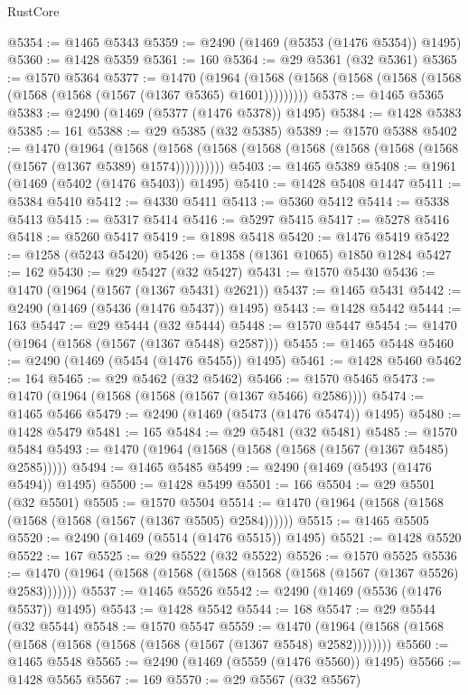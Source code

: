 \begin{lexlean}{RustCore}
\begin{coremodule}
@5354 := @1465 @5343
@5359 := @2490 (@1469 (@5353 (@1476 @5354)) @1495)
@5360 := @1428 @5359
@5361 := 160
@5364 := @29 @5361 (@32 @5361)
@5365 := @1570 @5364
@5377 := @1470
    (@1964 (@1568 (@1568 (@1568 (@1568 (@1568 (@1568 (@1568 (@1567 (@1367 @5365) @1601)))))))))
@5378 := @1465 @5365
@5383 := @2490 (@1469 (@5377 (@1476 @5378)) @1495)
@5384 := @1428 @5383
@5385 := 161
@5388 := @29 @5385 (@32 @5385)
@5389 := @1570 @5388
@5402 := @1470
    (@1964
      (@1568 (@1568 (@1568 (@1568 (@1568 (@1568 (@1568 (@1568 (@1567 (@1367 @5389) @1574))))))))))
@5403 := @1465 @5389
@5408 := @1961 (@1469 (@5402 (@1476 @5403)) @1495)
@5410 := @1428 @5408 @1447
@5411 := @5384 @5410
@5412 := @4330 @5411
@5413 := @5360 @5412
@5414 := @5338 @5413
@5415 := @5317 @5414
@5416 := @5297 @5415
@5417 := @5278 @5416
@5418 := @5260 @5417
@5419 := @1898 @5418
@5420 := @1476 @5419
@5422 := @1258 (@5243 @5420)
@5426 := @1358 (@1361 @1065) @1850 @1284
@5427 := 162
@5430 := @29 @5427 (@32 @5427)
@5431 := @1570 @5430
@5436 := @1470 (@1964 (@1567 (@1367 @5431) @2621))
@5437 := @1465 @5431
@5442 := @2490 (@1469 (@5436 (@1476 @5437)) @1495)
@5443 := @1428 @5442
@5444 := 163
@5447 := @29 @5444 (@32 @5444)
@5448 := @1570 @5447
@5454 := @1470 (@1964 (@1568 (@1567 (@1367 @5448) @2587)))
@5455 := @1465 @5448
@5460 := @2490 (@1469 (@5454 (@1476 @5455)) @1495)
@5461 := @1428 @5460
@5462 := 164
@5465 := @29 @5462 (@32 @5462)
@5466 := @1570 @5465
@5473 := @1470 (@1964 (@1568 (@1568 (@1567 (@1367 @5466) @2586))))
@5474 := @1465 @5466
@5479 := @2490 (@1469 (@5473 (@1476 @5474)) @1495)
@5480 := @1428 @5479
@5481 := 165
@5484 := @29 @5481 (@32 @5481)
@5485 := @1570 @5484
@5493 := @1470 (@1964 (@1568 (@1568 (@1568 (@1567 (@1367 @5485) @2585)))))
@5494 := @1465 @5485
@5499 := @2490 (@1469 (@5493 (@1476 @5494)) @1495)
@5500 := @1428 @5499
@5501 := 166
@5504 := @29 @5501 (@32 @5501)
@5505 := @1570 @5504
@5514 := @1470 (@1964 (@1568 (@1568 (@1568 (@1568 (@1567 (@1367 @5505) @2584))))))
@5515 := @1465 @5505
@5520 := @2490 (@1469 (@5514 (@1476 @5515)) @1495)
@5521 := @1428 @5520
@5522 := 167
@5525 := @29 @5522 (@32 @5522)
@5526 := @1570 @5525
@5536 := @1470 (@1964 (@1568 (@1568 (@1568 (@1568 (@1568 (@1567 (@1367 @5526) @2583)))))))
@5537 := @1465 @5526
@5542 := @2490 (@1469 (@5536 (@1476 @5537)) @1495)
@5543 := @1428 @5542
@5544 := 168
@5547 := @29 @5544 (@32 @5544)
@5548 := @1570 @5547
@5559 := @1470 (@1964 (@1568 (@1568 (@1568 (@1568 (@1568 (@1568 (@1567 (@1367 @5548) @2582))))))))
@5560 := @1465 @5548
@5565 := @2490 (@1469 (@5559 (@1476 @5560)) @1495)
@5566 := @1428 @5565
@5567 := 169
@5570 := @29 @5567 (@32 @5567)

\end{coremodule}
\end{lexlean}
